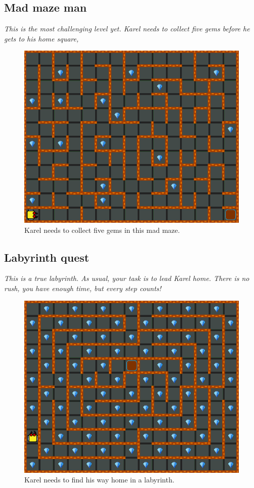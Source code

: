 \subsection{Mad maze man}

{\em This is the most challenging level yet. Karel needs to collect five gems before he gets to his home square,}\\[-7mm]

\begin{figure}[!ht]
\begin{center}
\includegraphics[height=0.4\textwidth]{img/a09.png}
\end{center}
\vspace{-4mm}
\caption{Karel needs to collect five gems in this mad maze.}
\label{fig:a09}
\vspace{-10mm}
\end{figure}
\noindent
\newpage

\subsection{Labyrinth quest}

{\em This is a true labyrinth. As usual, your task is to lead Karel home. There is no rush, you have enough time, but every step counts!}

\begin{figure}[!ht]
\begin{center}
\includegraphics[height=0.4\textwidth]{img/a10.png}
\end{center}
\vspace{-4mm}
\caption{Karel needs to find his way home in a labyrinth.}
\label{fig:a10}
\vspace{-4mm}
\end{figure}
\noindent


